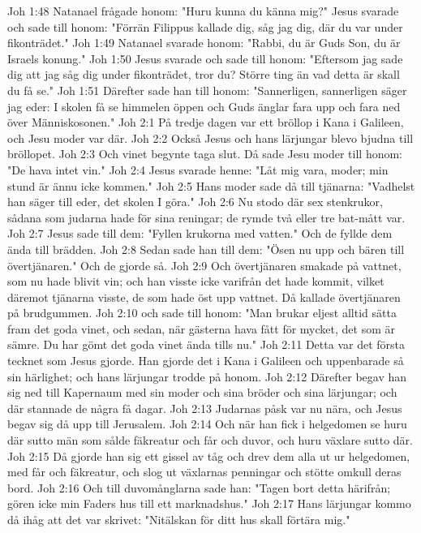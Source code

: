 Joh 1:48  Natanael frågade honom: "Huru kunna du känna mig?" Jesus svarade och sade till honom: "Förrän Filippus kallade dig, såg jag dig, där du var under fikonträdet."
Joh 1:49  Natanael svarade honom: "Rabbi, du är Guds Son, du är Israels konung."
Joh 1:50  Jesus svarade och sade till honom: "Eftersom jag sade dig att jag såg dig under fikonträdet, tror du? Större ting än vad detta är skall du få se."
Joh 1:51  Därefter sade han till honom: "Sannerligen, sannerligen säger jag eder: I skolen få se himmelen öppen och Guds änglar fara upp och fara ned över Människosonen."
Joh 2:1  På tredje dagen var ett bröllop i Kana i Galileen, och Jesu moder var där.
Joh 2:2  Också Jesus och hans lärjungar blevo bjudna till bröllopet.
Joh 2:3  Och vinet begynte taga slut. Då sade Jesu moder till honom: "De hava intet vin."
Joh 2:4  Jesus svarade henne: "Låt mig vara, moder; min stund är ännu icke kommen."
Joh 2:5  Hans moder sade då till tjänarna: "Vadhelst han säger till eder, det skolen I göra."
Joh 2:6  Nu stodo där sex stenkrukor, sådana som judarna hade för sina reningar; de rymde två eller tre bat-mått var.
Joh 2:7  Jesus sade till dem: "Fyllen krukorna med vatten." Och de fyllde dem ända till brädden.
Joh 2:8  Sedan sade han till dem: "Ösen nu upp och bären till övertjänaren." Och de gjorde så.
Joh 2:9  Och övertjänaren smakade på vattnet, som nu hade blivit vin; och han visste icke varifrån det hade kommit, vilket däremot tjänarna visste, de som hade öst upp vattnet. Då kallade övertjänaren på brudgummen.
Joh 2:10  och sade till honom: "Man brukar eljest alltid sätta fram det goda vinet, och sedan, när gästerna hava fått för mycket, det som är sämre. Du har gömt det goda vinet ända tills nu."
Joh 2:11  Detta var det första tecknet som Jesus gjorde. Han gjorde det i Kana i Galileen och uppenbarade så sin härlighet; och hans lärjungar trodde på honom.
Joh 2:12  Därefter begav han sig ned till Kapernaum med sin moder och sina bröder och sina lärjungar; och där stannade de några få dagar.
Joh 2:13  Judarnas påsk var nu nära, och Jesus begav sig då upp till Jerusalem.
Joh 2:14  Och när han fick i helgedomen se huru där sutto män som sålde fäkreatur och får och duvor, och huru växlare sutto där.
Joh 2:15  Då gjorde han sig ett gissel av tåg och drev dem alla ut ur helgedomen, med får och fäkreatur, och slog ut växlarnas penningar och stötte omkull deras bord.
Joh 2:16  Och till duvomånglarna sade han: "Tagen bort detta härifrån; gören icke min Faders hus till ett marknadshus."
Joh 2:17  Hans lärjungar kommo då ihåg att det var skrivet: "Nitälskan för ditt hus skall förtära mig."
